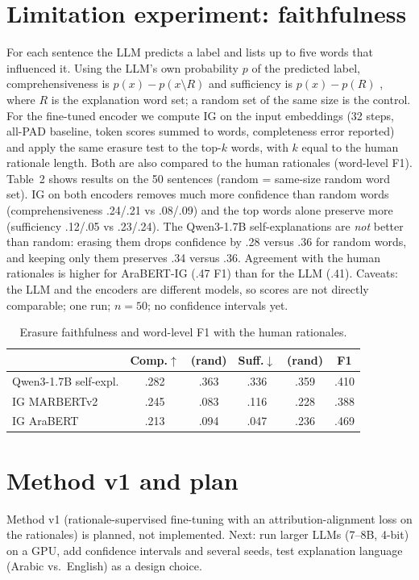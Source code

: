 \documentclass[11pt]{article}
\begin{document}
\section{Limitation experiment: faithfulness}
For each sentence the LLM predicts a label and lists up to five words that influenced it. Using the
LLM's own probability $p$ of the predicted label, comprehensiveness is $p(x)-p(x\setminus R)$ and
sufficiency is $p(x)-p(R)$ \citep{deyoung2020eraser}, where $R$ is the explanation word set; a random set of the same
size is the control. For the fine-tuned encoder we compute IG on the input embeddings
\citep{sundararajan2017axiomatic} (32 steps, all-PAD baseline, token scores summed to words, completeness
error reported) and apply the same erasure test to the top-$k$ words, with $k$ equal to the human
rationale length. Both are also compared to the human rationales (word-level F1).
Table~2 shows results on the 50 sentences (random = same-size random word set). IG on both encoders removes much more
confidence than random words (comprehensiveness .24/.21 vs .08/.09) and the top words alone preserve more
(sufficiency .12/.05 vs .23/.24). The Qwen3-1.7B self-explanations are \emph{not} better than random: erasing
them drops confidence by .28 versus .36 for random words, and keeping only them preserves .34 versus .36.
Agreement with the human rationales is higher for AraBERT-IG (.47 F1) than for the LLM (.41). Caveats: the LLM and the encoders
are different models, so scores are not directly comparable; one run; $n{=}50$; no confidence intervals yet.

\begin{table}[h]\centering\small\setlength{\tabcolsep}{3pt}
\begin{tabular}{lccccc}\toprule
 & Comp.$\uparrow$ & (rand) & Suff.$\downarrow$ & (rand) & F1\\\midrule
Qwen3-1.7B self-expl. & .282 & .363 & .336 & .359 & .410\\
IG MARBERTv2 & .245 & .083 & .116 & .228 & .388\\
IG AraBERT & .213 & .094 & .047 & .236 & .469\\\bottomrule
\end{tabular}\caption{Erasure faithfulness and word-level F1 with the human rationales.}
\end{table}

\section{Method v1 and plan}
Method v1 (rationale-supervised fine-tuning with an attribution-alignment loss on the rationales) is planned, not implemented.
Next: run larger LLMs (7--8B, 4-bit) on a GPU, add confidence intervals and several seeds,
test explanation language (Arabic vs.\ English) as a design choice.
\end{document}

